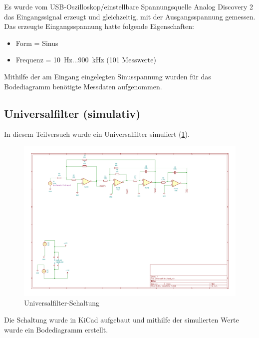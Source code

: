 Es wurde vom USB-Oszilloskop/einstellbare Spannungsquelle Analog Discovery 2 das Eingangssignal erzeugt und gleichzeitig, mit der Ausgangsspannung gemessen. Das erzeugte Eingangsspannung hatte folgende Eigenschaften:

\begin{itemize}
    \item Form = Sinus 
    \item Frequenz = \SI{10}{\hertz}...\SI{900}{\kilo\hertz} (101 Messwerte)
\end{itemize}
%
Mithilfe der am Eingang eingelegten Sinusspannung wurden für das Bodediagramm benötigte Messdaten aufgenommen.

 
%
\subsection{Universalfilter (simulativ)}

In diesem Teilversuch wurde ein Universalfilter simuliert (\ref{fig:Universal_circuit}).


\begin{figure}[H]
 \centering
 \includegraphics[width=0.7\linewidth]{Elektronik-Laborprotokoll_Filter/Circuits/universalfilter.pdf}
 \caption{ Universalfilter-Schaltung}
 \label{fig:Universal_circuit}
\end{figure}


Die Schaltung wurde in KiCad aufgebaut und mithilfe der simulierten Werte wurde ein Bodediagramm erstellt.

